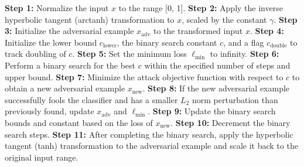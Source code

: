 \textbf{Step 1:} Normalize the input $x$ to the range [0, 1].
\textbf{Step 2:} Apply the inverse hyperbolic tangent (arctanh) transformation to $x$, scaled by the constant $\gamma$.
\textbf{Step 3:} Initialize the adversarial example $x_{\text{adv}}$ to the transformed input $x$.
\textbf{Step 4:} Initialize the lower bound $c_{\text{lower}}$, the binary search constant $c$, and a flag $c_{\text{double}}$ to track doubling of $c$.
\textbf{Step 5:} Set the minimum loss $\ell_{\text{min}}$ to infinity.
\textbf{Step 6:} Perform a binary search for the best $c$ within the specified number of steps and upper bound.
\textbf{Step 7:} Minimize the attack objective function with respect to $c$ to obtain a new adversarial example $x_{\text{new}}$.
\textbf{Step 8:} If the new adversarial example successfully fools the classifier and has a smaller $L_2$ norm perturbation than previously found, update $x_{\text{adv}}$ and $\ell_{\text{min}}$.
\textbf{Step 9:} Update the binary search bounds and constant based on the loss of $x_{\text{new}}$.
\textbf{Step 10:} Decrement the binary search steps.
\textbf{Step 11:} After completing the binary search, apply the hyperbolic tangent (tanh) transformation to the adversarial example and scale it back to the original input range.

